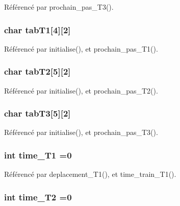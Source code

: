 Référencé par prochain\+\_\+pas\+\_\+\+T3().

\subsubsection[{tab\+T1}]{\setlength{\rightskip}{0pt plus 5cm}char tab\+T1[4][2]}\label{thread_8h_a83a7ab050ef5f6001530bab2951d76f4}


Référencé par initialise(), et prochain\+\_\+pas\+\_\+\+T1().

\subsubsection[{tab\+T2}]{\setlength{\rightskip}{0pt plus 5cm}char tab\+T2[5][2]}\label{thread_8h_a937f8a083d2eb0ddf332cf0e0eaf6a9b}


Référencé par initialise(), et prochain\+\_\+pas\+\_\+\+T2().

\subsubsection[{tab\+T3}]{\setlength{\rightskip}{0pt plus 5cm}char tab\+T3[5][2]}\label{thread_8h_aa09683f54909b8bde1c6be7b09283531}


Référencé par initialise(), et prochain\+\_\+pas\+\_\+\+T3().

\subsubsection[{time\+\_\+\+T1}]{\setlength{\rightskip}{0pt plus 5cm}int time\+\_\+\+T1 =0}\label{thread_8h_afbbe5c8bda3844141662fc6b4a61c041}


Référencé par deplacement\+\_\+\+T1(), et time\+\_\+train\+\_\+\+T1().

\subsubsection[{time\+\_\+\+T2}]{\setlength{\rightskip}{0pt plus 5cm}int time\+\_\+\+T2 =0}\label{thread_8h_abfd7eef7b196e27888a949f66e4a20a8}


